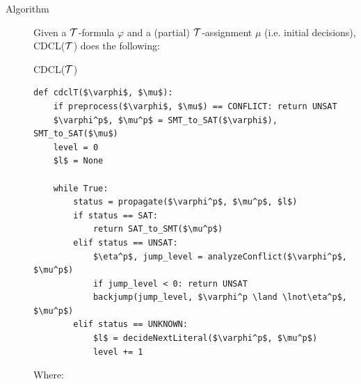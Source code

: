 \begin{description}
    \item[Algorithm]
        Given a $\mathcal{T}$-formula $\varphi$ and a (partial) $\mathcal{T}$-assignment $\mu$ (i.e. initial decisions),
        CDCL($\mathcal{T}$) does the following:
        \begin{algorithm}
            \caption{CDCL($\mathcal{T}$)}
            \begin{lstlisting}[mathescape=true]
def cdclT($\varphi$, $\mu$):
    if preprocess($\varphi$, $\mu$) == CONFLICT: return UNSAT
    $\varphi^p$, $\mu^p$ = SMT_to_SAT($\varphi$), SMT_to_SAT($\mu$)
    level = 0
    $l$ = None

    while True:
        status = propagate($\varphi^p$, $\mu^p$, $l$)
        if status == SAT: 
            return SAT_to_SMT($\mu^p$)
        elif status == UNSAT:
            $\eta^p$, jump_level = analyzeConflict($\varphi^p$, $\mu^p$)
            if jump_level < 0: return UNSAT
            backjump(jump_level, $\varphi^p \land \lnot\eta^p$, $\mu^p$)
        elif status == UNKNOWN:
            $l$ = decideNextLiteral($\varphi^p$, $\mu^p$)
            level += 1
            \end{lstlisting}
        \end{algorithm}

        Where:
\end{description}
